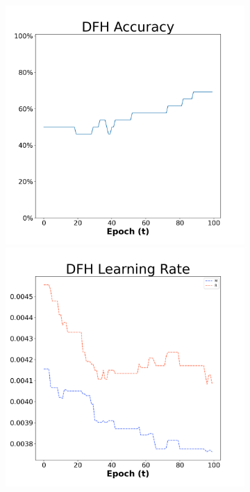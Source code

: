 \begin{figure}[H]
    \centering %
\begin{subfigure}{0.3\textwidth}
  \includegraphics[width=\linewidth]{images/exper1/Sonar/DFH_0.01_acc.png}
    \includegraphics[width=\linewidth]{images/exper1/Sonar/DFH_0.01_lr.png}

\end{subfigure}
\end{figure}
